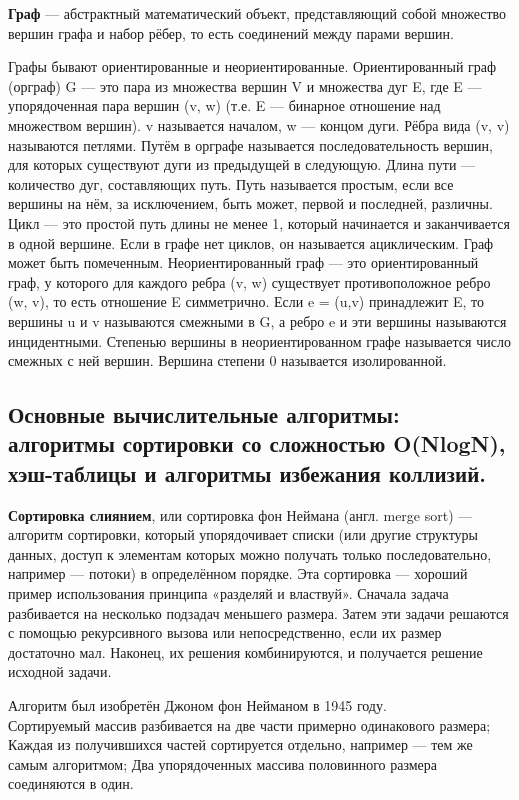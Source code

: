 \documentclass[12pt, a4paper]{article}
\begin{document}
\textbf{Граф} — абстрактный математический объект, представляющий собой множество вершин графа и набор рёбер, то есть соединений между парами вершин.

Графы бывают ориентированные и неориентированные. 
Ориентированный граф (орграф) G — это пара из множества вершин V и множества дуг E, где E — упорядоченная пара вершин (v, w) (т.е. E — бинарное отношение над множеством вершин). v называется началом, w — концом дуги. Рёбра вида (v, v) называются петлями.
Путём в орграфе называется последовательность вершин, для которых существуют дуги из предыдущей в следующую. Длина пути — количество дуг, составляющих путь. Путь называется простым, если все вершины на нём, за исключением, быть может, первой и последней, различны. Цикл — это простой путь длины не менее 1, который начинается и заканчивается в одной вершине. Если в графе нет циклов, он называется ациклическим. Граф может быть помеченным.
Неориентированный граф — это ориентированный граф, у которого для каждого ребра (v, w) существует противоположное ребро (w, v), то есть отношение E симметрично. Если e = (u,v) принадлежит E, то вершины u и v называются смежными в G, а ребро e и эти вершины называются инцидентными. Степенью вершины в неориентированном графе называется число смежных с ней вершин. Вершина степени 0 называется изолированной.


\subsection{Основные вычислительные алгоритмы: алгоритмы сортировки со сложностью O(NlogN), хэш-таблицы и алгоритмы избежания коллизий.}

\textbf{Сортировка слиянием}, или сортировка фон Неймана (англ. merge sort) — алгоритм сортировки, который упорядочивает списки (или другие структуры данных, доступ к элементам которых можно получать только последовательно, например — потоки) в определённом порядке. Эта сортировка — хороший пример использования принципа «разделяй и властвуй». Сначала задача разбивается на несколько подзадач меньшего размера. Затем эти задачи решаются с помощью рекурсивного вызова или непосредственно, если их размер достаточно мал. Наконец, их решения комбинируются, и получается решение исходной задачи.

Алгоритм был изобретён Джоном фон Нейманом в 1945 году.\\

Сортируемый массив разбивается на две части примерно одинакового размера;
Каждая из получившихся частей сортируется отдельно, например — тем же самым алгоритмом;
Два упорядоченных массива половинного размера соединяются в один.\\
\end{document}
